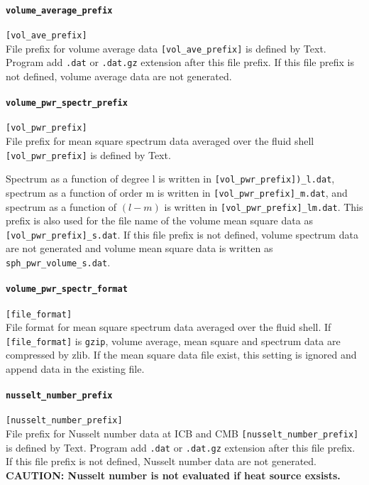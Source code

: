 \paragraph{\tt volume\_average\_prefix}
\label{href_t:volume_average_prefix}
\verb|[vol_ave_prefix]| \\
File prefix for volume average data \verb|[vol_ave_prefix]| is defined by Text. Program add {\tt .dat} or {\tt .dat.gz} extension after this file prefix. If this file prefix is not defined, volume average data are not generated. 

\paragraph{\tt volume\_pwr\_spectr\_prefix}
\label{href_t:volume_pwr_spectr_prefix}
\verb|[vol_pwr_prefix]| \\
File prefix for mean square spectrum data averaged over the fluid shell \verb|[vol_pwr_prefix]| is defined by Text. 

Spectrum as a function of degree {l} is written in \verb|[vol_pwr_prefix])_l.dat|, spectrum as a function of order {m} is written in \verb|[vol_pwr_prefix]_m.dat|, and spectrum as a function of $(l-m)$ is written in \verb|[vol_pwr_prefix]_lm.dat|. This prefix is also used for the file name of the volume mean square data as \verb|[vol_pwr_prefix]_s.dat|.
If this file prefix is not defined, volume spectrum data are not generated and volume mean square data is written as \verb|sph_pwr_volume_s.dat|.

\paragraph{\tt volume\_pwr\_spectr\_format}
\label{href_t:volume_pwr_spectr_format}
\verb|[file_format]| \\
File format for mean square spectrum data averaged over the fluid shell. If \verb|[file_format]| is \verb|gzip|, volume average, mean square and spectrum data are compressed by zlib.  If the mean square data file exist, this setting is ignored and append data in the existing file.

\paragraph{\tt nusselt\_number\_prefix}
\label{href_t:nusselt_number_prefix}
\verb|[nusselt_number_prefix]| \\
File prefix for Nusselt number data at ICB and CMB \verb|[nusselt_number_prefix]| is defined by Text. Program add {\tt .dat} or {\tt .dat.gz} extension after this file prefix. If this file prefix is not defined, Nusselt number data are not generated. \\
{\bf CAUTION: Nusselt number is not evaluated if heat source exsists.}


